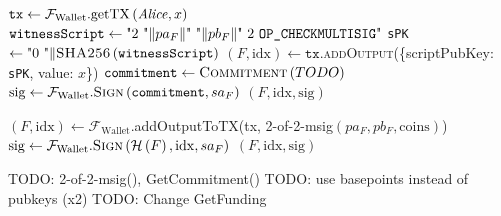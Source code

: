 \begin{algorithmic}[1]
     
      \State $\mathtt{tx} \gets
      \mathcal{F}_{\mathrm{Wallet}}.\mathrm{getTX}\left(\mathit{Alice}, x\right)$
      \State $\mathtt{witnessScript} \gets \text{"2 "} \Vert pa_F \Vert \text{"
      "} \Vert pb_F \Vert \text{" 2 \texttt{OP\_CHECKMULTISIG}"}$
      \State \texttt{sPK} $\gets \text{"0 "} \Vert
      \textsc{SHA256}\left(\mathtt{witnessScript}\right)$
      \State $\left(F, \mathrm{idx}\right) \gets
      \mathtt{tx}$.\textsc{addOutput}(\{scriptPubKey: \texttt{sPK}, value:
      $x$\})
      \State $\mathtt{commitment} \gets \textsc{Commitment}\left(TODO\right)$
      \State $\mathrm{sig} \gets
      \mathcal{F}_{\mathrm{Wallet}}.\textsc{Sign}\left(\mathtt{commitment},
      sa_F\right)$ 
      \State \Return $\left(F, \mathrm{idx}, \mathrm{sig}\right)$
    \EndFunction
    \State

      \State $\left(F, \mathrm{idx}\right) \gets
      \mathcal{F}_{\mathrm{Wallet}}$.addOutputToTX(tx, 2-of-2-msig$\left(pa_F,
      pb_F, \mathrm{coins}\right)$)
      \State $\mathrm{sig} \gets
      \mathcal{F}_{\mathrm{Wallet}}.\textsc{Sign}\left(\mathcal{H}\left(F\right),
      \mathrm{idx}, sa_F\right)$
      \State \Return $\left(F, \mathrm{idx}, \mathrm{sig}\right)$
    \EndFunction
    \State

    \State TODO: 2-of-2-msig(), GetCommitment()
    \State TODO: use basepoints instead of pubkeys (x2)
    \State TODO: Change GetFunding
    \State


\end{algorithmic}
